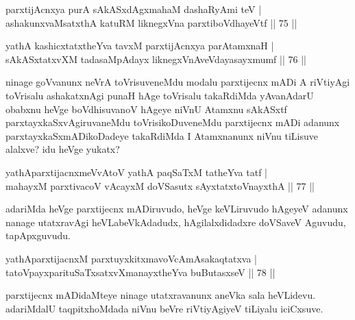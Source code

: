
\begin{shl}
parxtijAcnxya purA sAkASxdAgxmahaM dashaRyAmi teV |\\
ashakunxvaMsatxthA katuRM liknegxVna parxtiboVdhayeVtf \hfill || 75 ||
\end{shl}

\begin{shl}
yathA kashicxtatxtheYva tavxM parxtijAcnxya parAtamxnaH |\\
sAkASxtatxvXM tadasaMpAdayx liknegxVnA\s \s veVdayasayxmumf \hfill || 76 ||
\end{shl}

\begin{artha}
ninage goVvanunx neVrA toVrisuveneMdu modalu parxtijecnx mADi A riVtiyAgi toVrisalu ashakatxnAgi punaH hAge toVrisalu takaRdiMda yAvanAdarU obabxnu heVge boVdhisuvanoV hAgeye niVnU Atamxnu sAkASxtf parxtayxkaSxvAgiruvaneMdu toVrisikoDuveneMdu parxtijecnx mADi adanunx parxtayxkaSxmADikoDadeye takaRdiMda I Atamxnanunx niVnu tiLisuve alalxve? idu heVge yukatx?
\end{artha}

\begin{shl}
yathAparxtijacnxmeVvAtoV yathA paqSaTxM tatheYva tatf |\\
mahayxM parxtivacoV vAcayxM doVSasutx sAyxtatxtoV\s nayxthA \hfill || 77 ||
\end{shl}

\begin{artha}%
adariMda heVge parxtijecnx mADiruvudo, heVge keVLiruvudo hAgeyeV adanunx nanage utatxravAgi heVLabeVkAdadudx, hAgilalxdidadxre doVSaveV Aguvudu, tapApxguvudu.
\end{artha}


\begin{shl}
yathAparxtijacnxM parxtuyxkitxmavoVcAmAsakaqtatxva |\\
tatoV\s payxparituSaTxsatxvXmanayxtheYva buButasxseV \hfill || 78 ||
\end{shl}

\begin{artha}
parxtijecnx mADidaMteye ninage utatxravanunx aneVka sala heVLidevu. adariMdalU taqpitxhoMdada niVnu beVre riVtiyAgiyeV tiLiyalu iciCxsuve. 
\end{artha}


